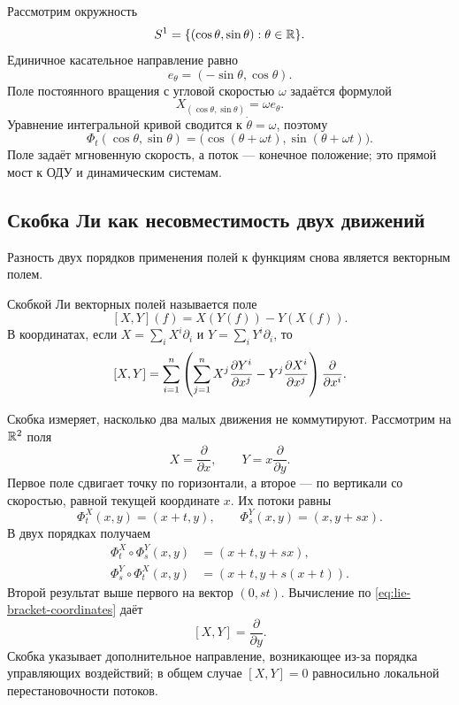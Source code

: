 Рассмотрим окружность
\[
S^1=\{(\cos\theta,\sin\theta):\theta\in\mathbb{R}\}.
\]
Единичное касательное направление равно
\[
e_\theta=(-\sin\theta,\cos\theta).
\]
Поле постоянного вращения с угловой скоростью \(\omega\) задаётся формулой
\[
X_{(\cos\theta,\sin\theta)}=\omega e_\theta.
\]
Уравнение интегральной кривой сводится к \(\dot\theta=\omega\), поэтому
\begin{equation}
\label{eq:circle-rotation-flow}
\Phi_t(\cos\theta,\sin\theta)
=
\bigl(\cos(\theta+\omega t),\sin(\theta+\omega t)\bigr).
\end{equation}
Поле задаёт мгновенную скорость, а поток --- конечное положение; это прямой мост к ОДУ и динамическим системам.

\subsection{Скобка Ли как несовместимость двух движений}

Разность двух порядков применения полей к функциям снова является векторным полем.

\begin{definition}
Скобкой Ли векторных полей называется поле
\begin{equation}
\label{eq:lie-bracket-definition}
[X,Y](f)=X(Y(f))-Y(X(f)).
\end{equation}
В координатах, если \(X=\sum_iX^i\partial_i\) и \(Y=\sum_iY^i\partial_i\), то
\begin{equation}
\label{eq:lie-bracket-coordinates}
[X,Y]
=
\sum_{i=1}^n
\left(
\sum_{j=1}^n
X^j\frac{\partial Y^i}{\partial x^j}
-
Y^j\frac{\partial X^i}{\partial x^j}
\right)
\frac{\partial}{\partial x^i}.
\end{equation}
\end{definition}

Скобка измеряет, насколько два малых движения не коммутируют. Рассмотрим на \(\mathbb{R}^2\) поля
\[
X=\frac{\partial}{\partial x},
\qquad
Y=x\frac{\partial}{\partial y}.
\]
Первое поле сдвигает точку по горизонтали, а второе --- по вертикали со скоростью, равной текущей координате \(x\). Их потоки равны
\[
\Phi_t^X(x,y)=(x+t,y),
\qquad
\Phi_s^Y(x,y)=(x,y+sx).
\]
В двух порядках получаем
\begin{align}
\Phi_t^X\circ\Phi_s^Y(x,y)
&=(x+t,y+sx),\\
\Phi_s^Y\circ\Phi_t^X(x,y)
&=(x+t,y+s(x+t)).
\end{align}
Второй результат выше первого на вектор \((0,st)\). Вычисление по \eqref{eq:lie-bracket-coordinates} даёт
\begin{equation}
\label{eq:lie-bracket-noncommuting-example}
[X,Y]=\frac{\partial}{\partial y}.
\end{equation}
Скобка указывает дополнительное направление, возникающее из-за порядка управляющих воздействий; в общем случае \([X,Y]=0\) равносильно локальной перестановочности потоков.

